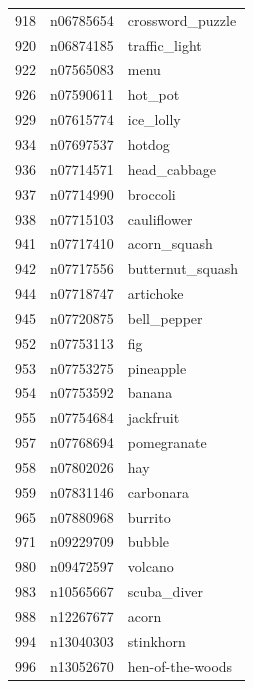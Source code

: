 \begin{table}
\begin{tabular}{cll}
918 & n06785654 & crossword_puzzle \\
920 & n06874185 & traffic_light \\
922 & n07565083 & menu \\
926 & n07590611 & hot_pot \\
929 & n07615774 & ice_lolly \\
934 & n07697537 & hotdog \\
936 & n07714571 & head_cabbage \\
937 & n07714990 & broccoli \\
938 & n07715103 & cauliflower \\
941 & n07717410 & acorn_squash \\
942 & n07717556 & butternut_squash \\
944 & n07718747 & artichoke \\
945 & n07720875 & bell_pepper \\
952 & n07753113 & fig \\
953 & n07753275 & pineapple \\
954 & n07753592 & banana \\
955 & n07754684 & jackfruit \\
957 & n07768694 & pomegranate \\
958 & n07802026 & hay \\
959 & n07831146 & carbonara \\
965 & n07880968 & burrito \\
971 & n09229709 & bubble \\
980 & n09472597 & volcano \\
983 & n10565667 & scuba_diver \\
988 & n12267677 & acorn \\
994 & n13040303 & stinkhorn \\
996 & n13052670 & hen-of-the-woods \\
\bottomrule
\end{tabular}
\end{table}
